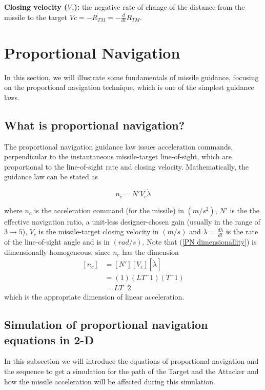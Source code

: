 \textbf{Closing velocity ($V_c$):} the negative rate of change of the distance
from the missile to the target $Vc= -\dot{R_{TM}}=-\frac{d}{dt} R_{TM} $.




\section{Proportional Navigation}
In this section, we will illustrate some fundamentals of missile guidance, focusing on the proportional navigation technique, which is one of the simplest guidance laws.

\subsection*{What is proportional navigation?}
The proportional navigation guidance law issues acceleration commands,
perpendicular to the instantaneous missile-target line-of-sight, which are
proportional to the line-of-sight rate and closing velocity. Mathematically, the
guidance law can be stated as

\begin{equation}
	n_c= N' V_c \dot{\lambda}
\end{equation}

where $n_c$ is the acceleration command (for the missile) in $(m/s^2)$, $N'$ is the the effective navigation ratio, a unit-less designer-chosen gain (usually in the range of $3 \to 5$), $V_c$ is the missile-target closing velocity in $(m/s)$ and $\dot{\lambda} = \frac{d\lambda}{dt}$ is the rate of the line-of-sight angle and is in $(rad/s)$. Note that (\ref{PN dimensionallity}) is dimensionally homogeneous, since $n_c$ has the dimension
\begin{equation}
	\begin{split}
	[n_c] &= [N'] [V_c] [\dot{\lambda}]\\
	&=(1) (LT^-1) (T^-1)\\
	&=LT^-2
	\end{split}
	\label{PN dimensionallity}
\end{equation}
which is the appropriate dimension of linear acceleration.

\subsection{Simulation of proportional navigation equations in 2-D}
In this subsection we will introduce the equations of proportional navigation and the sequence to get a simulation for the path of the Target and the Attacker and how the missile acceleration will be affected during this simulation.

